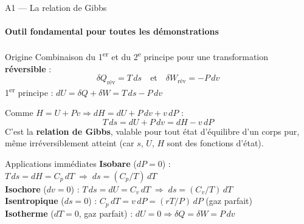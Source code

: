 \documentclass[aspectratio=43, 10pt]{beamer}
\begin{document}

\begin{frame}{A1 --- La relation de Gibbs}
  \framesubtitle{Outil fondamental pour toutes les d\'emonstrations}

  \begin{block}{Origine}
    \small
    Combinaison du 1\textsuperscript{er} et du 2\textsuperscript{e} principe
    pour une transformation \textbf{r\'eversible} :
    \[
      \delta Q_{\text{r\'ev}} = T\,ds
      \quad\text{et}\quad
      \delta W_{\text{r\'ev}} = -P\,dv
    \]
    1\textsuperscript{er} principe : $dU = \delta Q + \delta W = T\,ds - P\,dv$

    Comme $H = U + Pv \Rightarrow dH = dU + P\,dv + v\,dP$ :
    \[
      \boxed{T\,ds = dU + P\,dv = dH - v\,dP}
    \]
    C'est la \textbf{relation de Gibbs}, valable pour tout \'etat
    d'\'equilibre d'un corps pur, m\^eme irr\'eversiblement atteint
    (car $s$, $U$, $H$ sont des fonctions d'\'etat).
  \end{block}

  \vspace{-3pt}
  \begin{exampleblock}{Applications imm\'ediates}
    \small
    \textbf{Isobare} ($dP=0$) : $T\,ds = dH = C_p\,dT
    \;\Rightarrow\; ds = (C_p/T)\,dT$\\[1pt]
    \textbf{Isochore} ($dv=0$) : $T\,ds = dU = C_v\,dT
    \;\Rightarrow\; ds = (C_v/T)\,dT$\\[1pt]
    \textbf{Isentropique} ($ds=0$) : $C_p\,dT = v\,dP
    = (rT/P)\,dP$ (gaz parfait)\\[1pt]
    \textbf{Isotherme} ($dT=0$, gaz parfait) :
    $dU = 0 \Rightarrow \delta Q = \delta W = P\,dv$
  \end{exampleblock}

\end{frame}
\end{document}
